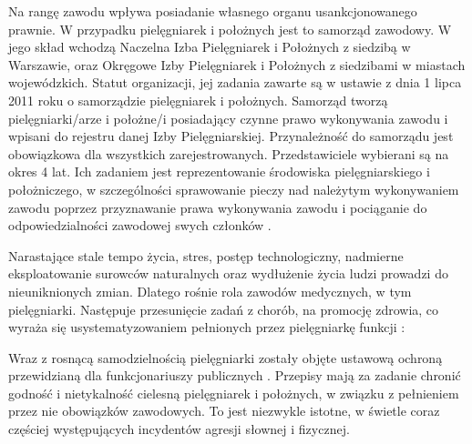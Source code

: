 \documentclass[a4paper,12pt,twoside,openright]{mwrep}
\begin{document}
Na rangę zawodu wpływa posiadanie własnego organu usankcjonowanego prawnie. W przypadku pielęgniarek i położnych jest to samorząd zawodowy. W jego skład wchodzą Naczelna Izba Pielęgniarek i Położnych z siedzibą w Warszawie, oraz Okręgowe Izby Pielęgniarek i Położnych z siedzibami w miastach wojewódzkich. Statut organizacji, jej zadania zawarte są w ustawie z dnia 1 lipca 2011 roku o samorządzie pielęgniarek i położnych. Samorząd tworzą pielęgniarki/arze i położne/i posiadający czynne prawo wykonywania zawodu i wpisani do rejestru danej Izby Pielęgniarskiej. Przynależność do samorządu jest obowiązkowa dla wszystkich zarejestrowanych. Przedstawiciele wybierani są na okres 4 lat. Ich zadaniem jest reprezentowanie środowiska pielęgniarskiego i położniczego, w szczególności sprawowanie pieczy nad należytym wykonywaniem zawodu poprzez przyznawanie prawa wykonywania zawodu i pociąganie do odpowiedzialności zawodowej swych członków \cite{nipip}.

Narastające stale tempo życia, stres, postęp technologiczny, nadmierne eksploatowanie surowców naturalnych oraz wydłużenie życia ludzi prowadzi do nieuniknionych zmian. Dlatego rośnie rola zawodów medycznych, w tym pielęgniarki. Następuje przesunięcie zadań z chorób, na promocję zdrowia, co wyraża się usystematyzowaniem pełnionych przez pielęgniarkę funkcji :

Wraz z rosnącą samodzielnością pielęgniarki zostały objęte ustawową ochroną przewidzianą dla funkcjonariuszy publicznych \cite{prawo}. Przepisy mają za zadanie chronić godność i nietykalność cielesną pielęgniarek i położnych, w związku z pełnieniem przez nie obowiązków zawodowych. To jest niezwykle istotne, w świetle coraz częściej występujących incydentów agresji słownej i fizycznej.
\end{document}
